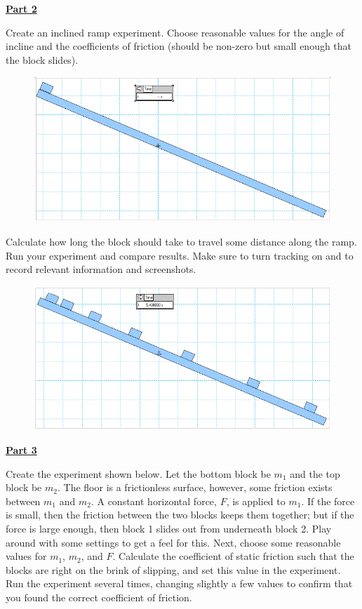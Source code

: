 \documentclass[12pt]{article}
\begin{document}
\underline{\textbf{Part 2}} \par
Create an inclined ramp experiment.
Choose reasonable values for the angle of incline and the coefficients of friction (should be non-zero but small enough that the block slides). 
%
\begin{figure}[H]
\includegraphics[scale=0.70]{figures/fig2a.png}
\end{figure}
%
Calculate how long the block should take to travel some distance along the ramp.
Run your experiment and compare results.
Make sure to turn tracking on and to record relevant information and screenshots.
%
\begin{figure}[H]
\includegraphics[scale=0.70]{figures/fig2b.png}
\end{figure}

\underline{\textbf{Part 3}} \par
Create the experiment shown below.
Let the bottom block be $m_1$ and the top block be $m_2$.
The floor is a frictionless surface, however, some friction exists between $m_1$ and $m_2$.
A constant horizontal force, $F$, is applied to $m_1$.
If the force is small, then the friction between the two blocks keeps them together; but if the force is large enough, then block 1 slides out from underneath block 2.
Play around with some settings to get a feel for this.
Next, choose some reasonable values for $m_1$, $m_2$, and $F$.
Calculate the coefficient of static friction such that the blocks are right on the brink of slipping, and set this value in the experiment.
Run the experiment several times, changing slightly a few values to confirm that you found the correct coefficient of friction.
\end{document}
